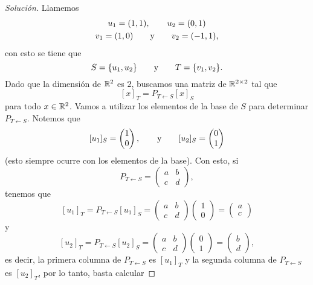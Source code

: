 \documentclass[a4,11pt]{aleph-notas}
\begin{document}
\begin{proof}[Solución]
    Llamemos
    \begin{gather*}
        u_1 = (1,1),\qquad
        u_2 = (0,1)\\
        v_1 = (1,0)\qquad\text{y}\qquad
        v_2 = (-1,1),
    \end{gather*}
    con esto se tiene que
    \[
        S = \{u_1,u_2\}
        \qquad\text{y}\qquad
        T = \{v_1,v_2\}.
    \]
    Dado que la dimensión de $\mathbb{R}^2$ es $2$, buscamos una matriz de $\mathbb{R}^{2\times 2}$ tal que
    \[
        [x]_T = P_{T \leftarrow S} [x]_S
    \]
    para todo $x\in \mathbb{R}^2$. Vamos a utilizar los elementos de la base de $S$ para determinar $P_{T \leftarrow S}$. Notemos que
    \[
        [u_1]_S = \begin{pmatrix} 1\\ 0  \end{pmatrix},
        \qquad\text{y}\qquad
        [u_2]_S = \begin{pmatrix} 0\\ 1  \end{pmatrix}
    \]
    (esto siempre ocurre con los elementos de la base). Con esto, si
    \[
        P_{T \leftarrow S} = 
        \begin{pmatrix}a & b \\ c & d \end{pmatrix},
    \]
    tenemos que
    \[
        [u_1]_T = P_{T \leftarrow S} [u_1]_S
        =\begin{pmatrix}a & b \\ c & d \end{pmatrix} 
        \begin{pmatrix} 1\\ 0  \end{pmatrix}
        = \begin{pmatrix} a\\ c  \end{pmatrix}
    \]
    y
    \[
        [u_2]_T = P_{T \leftarrow S} [u_2]_S
        =\begin{pmatrix}a & b \\ c & d \end{pmatrix} 
        \begin{pmatrix} 0\\ 1  \end{pmatrix}
        = \begin{pmatrix} b\\ d  \end{pmatrix},
    \]
    es decir, la primera columna de $P_{T \leftarrow S}$ es $[u_1]_T$ y la segunda columna de $P_{T \leftarrow S}$ es $[u_2]_T$, por lo tanto, basta calcular

\end{proof}
\end{document}
